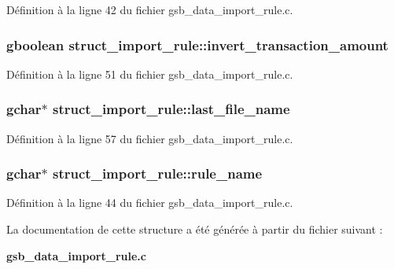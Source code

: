 Définition à la ligne 42 du fichier gsb\_\-data\_\-import\_\-rule.c.

\subsubsection[{invert\_\-transaction\_\-amount}]{\setlength{\rightskip}{0pt plus 5cm}gboolean {\bf struct\_\-import\_\-rule::invert\_\-transaction\_\-amount}}\label{structstruct__import__rule_a4b6c7c5884a3aaea4b1cbe4ab49df6a5}


Définition à la ligne 51 du fichier gsb\_\-data\_\-import\_\-rule.c.

\subsubsection[{last\_\-file\_\-name}]{\setlength{\rightskip}{0pt plus 5cm}gchar$\ast$ {\bf struct\_\-import\_\-rule::last\_\-file\_\-name}}\label{structstruct__import__rule_a31786113895bbebacd1e92386360c15f}


Définition à la ligne 57 du fichier gsb\_\-data\_\-import\_\-rule.c.

\subsubsection[{rule\_\-name}]{\setlength{\rightskip}{0pt plus 5cm}gchar$\ast$ {\bf struct\_\-import\_\-rule::rule\_\-name}}\label{structstruct__import__rule_a030a30cb61f0c5e61327f2512d1ef623}


Définition à la ligne 44 du fichier gsb\_\-data\_\-import\_\-rule.c.



La documentation de cette structure a été générée à partir du fichier suivant :\begin{DoxyCompactItemize}
\item 
{\bf gsb\_\-data\_\-import\_\-rule.c}\end{DoxyCompactItemize}
